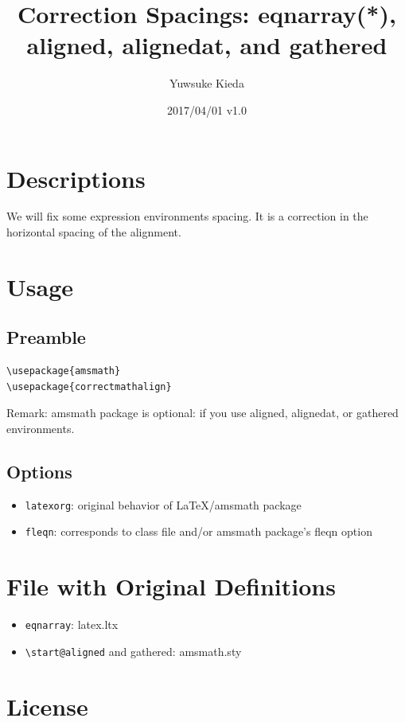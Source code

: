 \documentclass{article}
\title{Correction Spacings: eqnarray(*), aligned, alignedat, and gathered}
\author{Yuwsuke Kieda}
\date{2017/04/01 v1.0}
\begin{document}
\maketitle

\section{Descriptions}

We will fix some expression environments spacing.
It is a correction in the horizontal spacing of the alignment.

\section{Usage}

\subsection{Preamble}

\begin{verbatim}
\usepackage{amsmath}
\usepackage{correctmathalign}
\end{verbatim}

Remark: amsmath package is optional: if you use aligned, alignedat, or gathered environments.

\subsection{Options}

\begin{itemize}
 \item \verb!latexorg!: original behavior of LaTeX/amsmath package
 \item \verb!fleqn!: corresponds to class file and/or amsmath package's fleqn option
\end{itemize}

\section{File with Original Definitions}

\begin{itemize}
 \item \verb!eqnarray!: latex.ltx
 \item \verb!\start@aligned! and gathered: amsmath.sty
\end{itemize}

\section{License}
\end{document}
